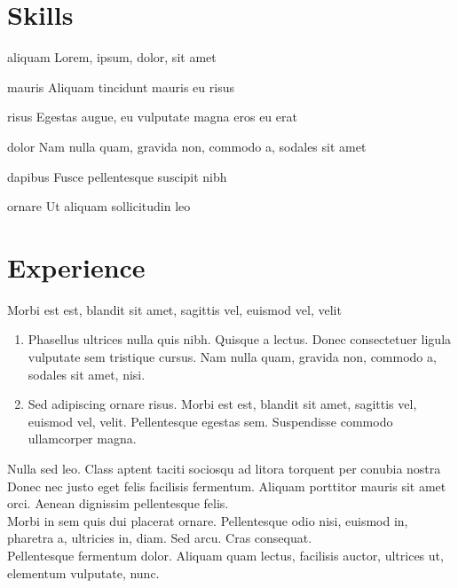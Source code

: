 \documentclass[letterpaper, 11pt]{nycv}
\begin{document}

\section*{Skills}
\begin{skills}
  \item[aliquam]Lorem, ipsum, dolor, sit amet
  \item[mauris]Aliquam tincidunt mauris eu risus
  \item[risus]Egestas augue, eu vulputate magna eros eu erat
  \item[dolor]Nam nulla quam, gravida non, commodo a, sodales sit amet
  \item[dapibus]Fusce pellentesque suscipit nibh
  \item[ornare]Ut aliquam sollicitudin leo
\end{skills}

\section*{Experience}

Morbi est est, blandit sit amet, sagittis vel, euismod vel, velit
\begin{leftbar}
\begin{enumerate}
  \item Phasellus ultrices nulla quis nibh. Quisque a lectus. Donec consectetuer ligula vulputate sem tristique cursus. Nam nulla quam, gravida non, commodo a, sodales sit amet, nisi.
  \item Sed adipiscing ornare risus. Morbi est est, blandit sit amet, sagittis vel, euismod vel, velit. Pellentesque egestas sem. Suspendisse commodo ullamcorper magna.
\end{enumerate}
\end{leftbar}

\noindent
Nulla sed leo. Class aptent taciti sociosqu ad litora torquent per conubia nostra
\vspace{6pt}\\
Donec nec justo eget felis facilisis fermentum. Aliquam porttitor mauris sit amet orci. Aenean dignissim pellentesque felis.
\vspace{6pt}\\
Morbi in sem quis dui placerat ornare. Pellentesque odio nisi, euismod in, pharetra a, ultricies in, diam. Sed arcu. Cras consequat.
\vspace{6pt}\\
Pellentesque fermentum dolor. Aliquam quam lectus, facilisis auctor, ultrices ut, elementum vulputate, nunc.
\end{document}
